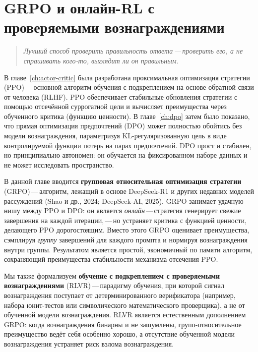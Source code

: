 \chapter[GRPO и онлайн-RL]{GRPO и онлайн-RL с проверяемыми вознаграждениями}
\label{ch:grpo}

\begin{quote}
\itshape
Лучший способ проверить правильность ответа\,---\,проверить его, а не спрашивать кого-то, выглядит ли он правильным.
\end{quote}

\bigskip

В главе~\ref{ch:actor-critic} была разработана проксимальная оптимизация стратегии (PPO)\,---\,основной алгоритм обучения с подкреплением на основе обратной связи от человека (RLHF). PPO обеспечивает стабильные обновления стратегии с помощью отсечённой суррогатной цели и вычисляет преимущества через обученного критика (функцию ценности). В главе~\ref{ch:dpo} затем было показано, что прямая оптимизация предпочтений (DPO) может полностью обойтись без модели вознаграждения, параметризуя KL-регуляризованную цель в виде контролируемой функции потерь на парах предпочтений. DPO прост и стабилен, но принципиально автономен: он обучается на фиксированном наборе данных и не может исследовать пространство.

В данной главе вводится \textbf{групповая относительная оптимизация стратегии} (GRPO)\,---\,алгоритм, лежащий в основе DeepSeek-R1 и других недавних моделей рассуждений (Shao и др., 2024; DeepSeek-AI, 2025). GRPO занимает удачную нишу между PPO и DPO: он является \emph{онлайн}\,---\,стратегия генерирует свежие завершения на каждой итерации,\,---\,но устраняет критика с функцией ценности, делающего PPO дорогостоящим. Вместо этого GRPO оценивает преимущества, сэмплируя \emph{группу} завершений для каждого промпта и нормируя вознаграждения внутри группы. Результатом является простой, экономичный по памяти алгоритм, сохраняющий преимущества стабильности механизма отсечения PPO.

Мы также формализуем \textbf{обучение с подкреплением с проверяемыми вознаграждениями} (RLVR)\,---\,парадигму обучения, при которой сигнал вознаграждения поступает от детерминированного верификатора (например, набора юнит-тестов или символического математического проверщика), а не от обученной модели вознаграждения. RLVR является естественным дополнением GRPO: когда вознаграждения бинарны и не зашумлены, групп-относительное преимущество ведёт себя особенно хорошо, а отсутствие обученной модели вознаграждения устраняет риск взлома вознаграждения.

